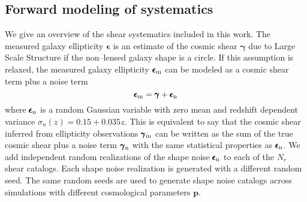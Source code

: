 \documentclass[reprint,aps,prd,superscriptaddress,showkeys,showpacs]{revtex4-1}
\newcommand{\bb}[1]{\mathbf{#1}}
\begin{document}
\subsection{Forward modeling of systematics}
We give an overview of the shear systematics included in this work. The measured galaxy ellipticity $\pmb{\epsilon}$ is an estimate of the cosmic shear $\pmb{\gamma}$ due to Large Scale Structure if the non--lensed galaxy shape is a circle. If this assumption is relaxed, the measured galaxy ellipticity $\pmb{\epsilon}_{\rm m}$ can be modeled as a cosmic shear term plus a noise term \citep{wlreview}
\begin{equation}
\pmb{\epsilon}_{\rm m} = \pmb{\gamma} + \pmb{\epsilon}_{\rm n}
\end{equation} 
%
where $\pmb{\epsilon}_{\rm n}$ is a random Gaussian variable with zero mean and redshift dependent variance $\sigma_n(z)=0.15+0.035z$. This is equivalent to say that the cosmic shear inferred from ellipticity observations $\pmb{\gamma}_{\rm m}$ can be written as the sum of the true cosmic shear plus a noise term $\pmb{\gamma}_{\rm n}$ with the same statistical properties as $\pmb{\epsilon}_{\rm n}$. 
We add independent random realizations of the shape noise $\pmb{\epsilon}_{\rm n}$ to each of the $N_r$ shear catalogs. Each shape noise realization is generated with a different random seed. The same random seeds are used to generate shape noise catalogs across simulations with different cosmological parameters $\bb{p}$. 
\end{document}
